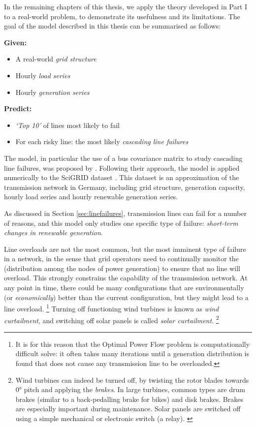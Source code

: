 \documentclass[main.tex]{subfiles}
\begin{document}
In the remaining chapters of this thesis, we apply the theory developed in Part I to a real-world problem, to demonstrate its usefulness and its limitations. The goal of the model described in this thesis can be summarised as follows:

\textbf{Given:}
\begin{itemize}
    \item A real-world \emph{grid structure}
    \item Hourly \emph{load series}
    \item Hourly \emph{generation series}
\end{itemize}
\textbf{Predict:}
\begin{itemize}
    \item \emph{`Top 10'} of lines most likely to fail
    \item For each risky line: the most likely \emph{cascading line failures}
\end{itemize}

The model, in particular the use of a bus covariance matrix to study cascading line failures, was proposed by \citet{Nesti2018emergentfailures}.\nocite{Nesti2018supplemental} Following their approach, the model is applied numerically to the SciGRID dataset \citep{SciGRIDv0.2}. This dataset is an approximation of the transmission network in Germany, including grid structure, generation capacity, hourly load series and hourly renewable generation series.

As discussed in Section \ref{sec:linefailures}, transmission lines can fail for a number of reasons, and this model only studies one specific type of failure: \emph{short-term changes in renewable generation}.

Line overloads are not the most common, but the most imminent type of failure in a network, in the sense that grid operators need to continually monitor the  (distribution among the nodes of power generation) to ensure that no line will overload.
This strongly constrains the capability of the transmission network. At any point in time, there could be many configurations that are environmentally (or \emph{economically}) better than the current configuration, but they might lead to a line overload.%
\footnote{It is for this reason that the Optimal Power Flow problem is computationally difficult solve: it often takes many iterations until a generation distribution is found that does not cause any transmission line to be overloaded.}
Turning off functioning wind turbines is known as \emph{wind curtailment}, and switching off solar panels is called \emph{solar curtailment}.%
\footnote{Wind turbines can indeed be turned off, by twisting the rotor blades towards $0\si{\degree}$ pitch and applying the \emph{brakes}. In large turbines, common types are drum brakes (similar to a back-pedalling brake for bikes) and disk brakes. Brakes are especially important during maintenance.
Solar panels are switched off using a simple mechanical or electronic switch (a relay). \citep{Denholm2015}}
\end{document}
